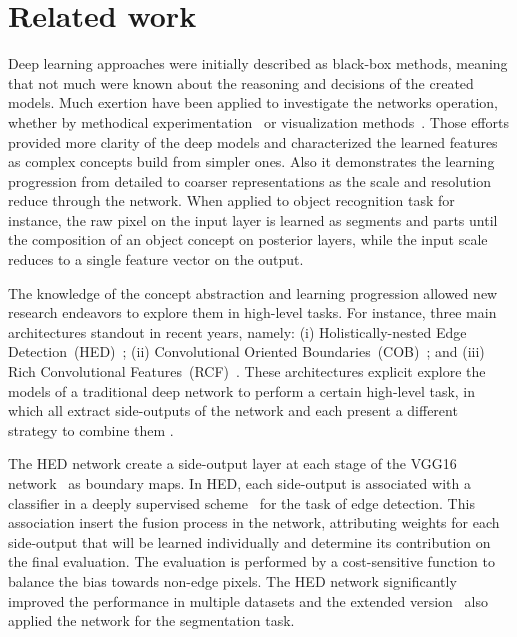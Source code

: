 \section{Related work}
\label{sec:related}




Deep learning approaches were initially described as black-box methods, meaning that not much were known about the reasoning and decisions of the created models. Much exertion have been applied to investigate the networks operation, whether by methodical experimentation~\cite{ilin17,kuo16,eigen14,zhang17} or visualization methods~\cite{simonyan13,zeiler14}. Those efforts provided more clarity of the deep models and characterized the learned features as complex concepts build from simpler ones. Also it demonstrates the learning progression from detailed to coarser representations as the scale and resolution reduce through the network.  When applied to object recognition task for instance, the raw pixel on the input layer is learned as segments and parts until the composition of an object concept on posterior layers, while the input scale reduces to a single feature vector on the output.  

The knowledge of the concept abstraction and learning progression allowed new research endeavors to explore  them in high-level tasks. For instance, three main architectures standout in recent years, namely: (i) Holistically-nested Edge Detection~(HED)~\cite{xie2015}; (ii) Convolutional Oriented Boundaries~(COB)~\cite{maninis2017}; and (iii) Rich Convolutional Features~(RCF)~\cite{liu2017}. These architectures explicit explore the models of a traditional deep network to perform a certain high-level task, in which all extract side-outputs of the network and each present a different strategy to combine them . 

The HED network create a side-output layer at each stage of the VGG16 network~\cite{simonyan2014} as boundary maps. In HED, each side-output is associated with a classifier in a deeply supervised scheme~\cite{lee2015} for the task of edge detection. This association insert the fusion process in the network, attributing weights for each side-output that will be learned individually and determine its contribution on the final evaluation. The evaluation is performed by a cost-sensitive function to balance the bias towards non-edge pixels. The HED network significantly improved the performance in multiple datasets and the extended version~\cite{xie2017} also applied the network for the segmentation task. 

